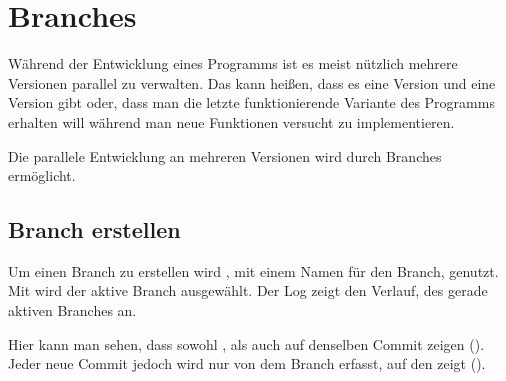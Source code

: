 \section{Branches}\label{sec:branch}
Während der Entwicklung eines Programms ist es meist nützlich mehrere Versionen parallel zu verwalten. Das kann heißen, dass es eine  Version und eine  Version gibt oder, dass man die letzte funktionierende Variante des Programms erhalten will während man neue Funktionen versucht zu implementieren.

Die parallele Entwicklung an mehreren Versionen wird durch Branches ermöglicht.
\subsection{Branch erstellen}
Um einen Branch zu erstellen wird , mit einem Namen für den Branch, genutzt. Mit  wird der aktive Branch ausgewählt. Der Log zeigt den Verlauf, des gerade aktiven Branches an.
Hier kann man sehen, dass sowohl , als auch  auf denselben Commit zeigen (). Jeder neue Commit jedoch wird nur von dem Branch erfasst, auf den  zeigt ().

